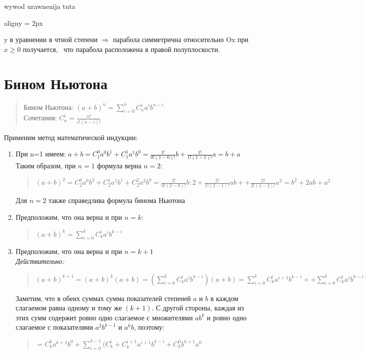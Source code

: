 \documentclass[oneside]{book}
\newcommand{\boxedeq}[2]{\begin{empheq}[box={\fboxsep=6pt\fbox}]{align}\label{#1}#2\end{empheq}}
\begin{document}
\begin{enumerate}
\begin{center}
    wywod urawnenija tuta

    \boxedeq{eq:*}{y = \pm 2px}
\end{center}
y в уравнении в чтной степени $\Rightarrow$ парабола симметрична относительно Ox при $x \geq 0$ получается, \
что парабола расположена в правой полуплоскости.
\setcounter{chapter}{3}
\chapter{Бином Ньютона}
\begin{quote}
	Бином Ньютона:
	$(a+b)^n=\sum\limits_{i=0}^nC_{n}^ia^ib^{n-i}$\\
	Сочетания: $C_{n}^i= \frac{n!}{i!(n-i)!} $
\end{quote}
Применим метод математической индукции:

\begin{enumerate}
	\item При n=1 имеем:
	$a+b=C_{1}^0a^0b^1+C_{1}^1a^1b^0=\frac{1!}{0!(1-0)!}b+\frac{1!}{1!(1-1)!}a=b+a$
	Таким образом, при $n=1$ формула верна
	 $n = 2$:
	\begin{quote}
		$(a+b)^2=C_2^0a^0b^2+C_2^1a^1b^1+C_2^2a^2b^0=\frac{2!}{0!(2-0)!}b:2+\frac{2!}{1!(2-1)!}ab++\frac{2!}{2!(2-2)!}a^2=b^2+2ab+a^2$
	\end{quote}
		Для $n=2$ также справедлива формула бинома Ньютона
	\item Предположим, что она верна и при $n=k$:
	\begin{quote}
		$(a+b)^k=\sum\limits_{i=0}^kC_{k}^ia^ib^{k-i}$
	\end{quote}
	\item Предположим, что она верна и при $n=k+1$\\\textit{Действительно:}
	\begin{quote}
	$(a+b)^{k+1}=(a+b)^k(a+b)=(\sum\limits_{i=0}^kC_{k}^ia^ib^{k-i})(a+b)=\sum\limits_{i=0}^kC_{k}^ia^{i+1}b^{k-i}++\sum\limits_{i=0}^kC_{k}^ia^ib^{k-i+1}=C_k^ka^{k+1}b^{0} + \sum\limits_{i=0}^{k-1}C_k^ia^{i+1}b^{k-i}+\sum\limits_{i=1}^{k}C_k^ia^{i}b^{k-i+1} + C_k^0b^{k+1}a^0=$
	\end{quote}
Заметим, что в обеих суммах сумма показателей степеней $a$ и $b$ в каждом слагаемом равна одному и тому же $(k+1)$. С другой стороны, каждая из этих сумм содержит ровно одно слагаемое с множителями $ab^k$ и ровно одно слагаемое с показателями $a^2b^{k-1}$ и $a^kb$, поэтому:
\begin{quote}$=C_k^ka^{k+1}b^{0} + \sum\limits_{i=0}^{k-1}(C_k^i + C_k^{i+1} a^{i+1}b^{k-i}+C_k^0b^{k+1}a^0$

\end{quote}
\end{enumerate}
\end{enumerate}
\end{document}
